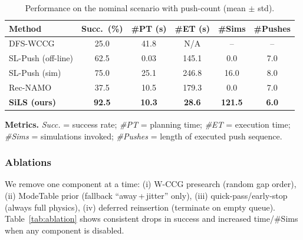 \begin{table}[t]
  \centering
  \begin{threeparttable}
  \caption{Performance on the nominal scenario with push-count (mean $\pm$ std).}
  \label{tab:main}
  \vspace{2pt}
  
  \setlength{\tabcolsep}{2.3pt} %
  
\begin{tabular}{lccccc}
\toprule
Method & Succ.~(\%) & \#PT (s) & \#ET (s) & \#Sims & \#Pushes \\
\midrule
DFS-WCCG            & 25.0  & 41.8  & N/A     & --    & --   \\
SL-Push (off-line)  & 62.5  & 0.03  & 145.1   & 0.0   & 7.0  \\
SL-Push (sim)       & 75.0  & 25.1  & 246.8   & 16.0  & 8.0  \\
Rec-NAMO            & 37.5  & 10.5  & 179.3   & 0.0   & 7.0  \\
\textbf{SiLS (ours)}& \textbf{92.5} & \textbf{10.3} & \textbf{28.6} & \textbf{121.5} & \textbf{6.0} \\
\bottomrule
\end{tabular}
  
  \begin{tablenotes}[flushleft]\footnotesize
  \item \textbf{Metrics.} \emph{Succ.} = success rate; \emph{\#PT} = planning time; \emph{\#ET} = execution time;
  \emph{\#Sims} = simulations invoked; \emph{\#Pushes} = length of executed push sequence.
  \end{tablenotes}
  \end{threeparttable}
  \end{table}
  


\subsubsection{Ablations}
\label{subsec:ablations}
We remove one component at a time: (i) W-CCG presearch (random gap order),
(ii) ModeTable prior (fallback “away\,+\,jitter” only),
(iii) quick-pass/early-stop (always full physics),
(iv) deferred reinsertion (terminate on empty queue).
Table~\ref{tab:ablation} shows consistent drops in success and increased
time/\#Sims when any component is disabled.

